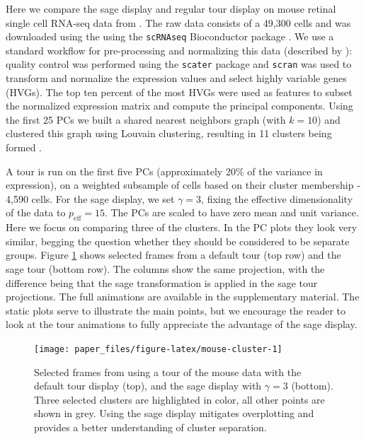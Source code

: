 \documentclass[]{interact}
\theoremstyle{plain}%
\theoremstyle{definition}
\theoremstyle{remark}
\begin{document}
Here we compare the sage display and regular tour display on mouse
retinal single cell RNA-seq data from \citet{Macosko2015-ot}. The raw
data consists of a 49,300 cells and was downloaded using the using the
\texttt{scRNAseq} Bioconductor package \citep{scRNAseq-d}. We use a
standard workflow for pre-processing and normalizing this data
(described by \citet{Amezquita2020-at}): quality control was performed
using the \texttt{scater} package \citep{McCarthy2017} and
\texttt{scran} \citep{Lun2016} was used to transform and normalize the
expression values and select highly variable genes (HVGs). The top ten
percent of the most HVGs were used as features to subset the normalized
expression matrix and compute the principal components. Using the first
25 PCs we built a shared nearest neighbors graph (with \(k = 10\)) and
clustered this graph using Louvain clustering, resulting in 11 clusters
being formed \citep{Blondel2008-bx}.

A tour is run on the first five PCs (approximately 20\% of the variance
in expression), on a weighted subsample of cells based on their cluster
membership - 4,590 cells. For the sage display, we set \(\gamma = 3\),
fixing the effective dimensionality of the data to
\(p_{\mathrm{eff}} = 15\). The PCs are scaled to have zero mean and unit
variance. Here we focus on comparing three of the clusters. In the PC
plots they look very similar, begging the question whether they should
be considered to be separate groups. Figure \ref{fig:mouse-cluster}
shows selected frames from a default tour (top row) and the sage tour
(bottom row). The columns show the same projection, with the difference
being that the sage transformation is applied in the sage tour
projections. The full animations are available in the supplementary
material. The static plots serve to illustrate the main points, but we
encourage the reader to look at the tour animations to fully appreciate
the advantage of the sage display.

\begin{figure}

{\centering \texttt{[image: paper\_files/figure-latex/mouse-cluster-1]} 

}

\caption{Selected frames from using a tour of the mouse data with the default tour display (top), and the sage display with $\gamma=3$ (bottom). Three selected clusters are highlighted in color, all other points are shown in grey. Using the sage display mitigates overplotting and provides a better understanding of cluster separation.}\label{fig:mouse-cluster}
\end{figure}
\end{document}
